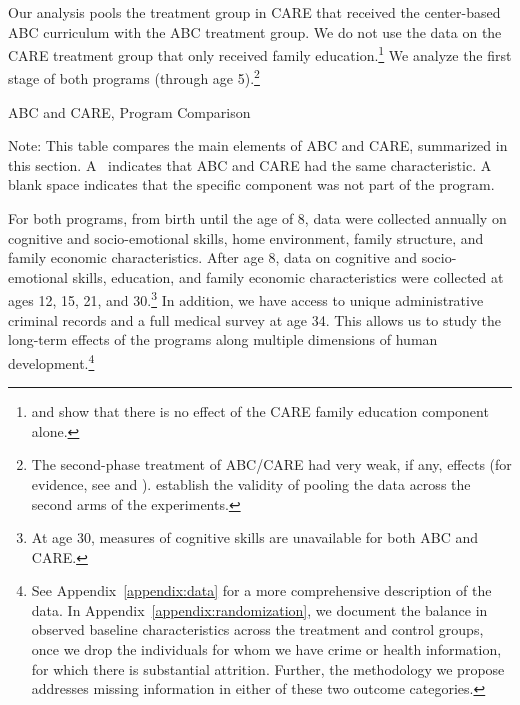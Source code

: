 Our analysis pools the treatment group in CARE that received the center-based ABC curriculum with the ABC treatment group. We do not use the data on the CARE treatment group that only received family education.\footnote{\citet{Campbell_Conti_etal_2014_EarlyChildhoodInvestments} and \citet{ABCCARE_Dataset} show that there is no effect of the CARE family education component alone.} We analyze the first stage of both programs (through age 5).\footnote{The second-phase treatment of ABC/CARE had very weak, if any, effects (for evidence, see \citealp{Campbell_Conti_etal_2014_EarlyChildhoodInvestments} and \citealp{ABCCARE_Dataset}). \citet{Campbell_Conti_etal_2014_EarlyChildhoodInvestments} establish the validity of pooling the data across the second arms of the experiments.}

\begin{table}[!htbp]
\centering
\caption{ABC and CARE, Program Comparison} \label{tab:programcomparison}
\begin{adjustbox}{max width=\textwidth}
\begin{threeparttable}
	\small
	
\begin{tablenotes}
\small
\item Note: This table compares the main elements of ABC and CARE, summarized in this section. A \checkmark\ indicates that ABC and CARE had the same characteristic. A blank space indicates that the specific component was not part of the program.
\end{tablenotes}
\end{threeparttable}
\end{adjustbox}
\end{table}

For both programs, from birth until the age of 8, data were collected annually on cognitive and socio-emotional skills, home environment, family structure, and family economic characteristics. After age 8, data on cognitive and socio-emotional skills, education, and family economic characteristics were collected at ages 12, 15, 21, and 30.\footnote{At age 30, measures of cognitive skills are unavailable for both ABC and CARE.} In addition, we have access to unique administrative criminal records and a full medical survey at age 34. This allows us to study the long-term effects of the programs along multiple dimensions of human development.\footnote{See Appendix~\ref{appendix:data} for a more comprehensive description of the data. In Appendix~\ref{appendix:randomization}, we document the balance in observed baseline characteristics across the treatment and control groups, once we drop the individuals for whom we have crime or health information, for which there is substantial attrition. Further, the methodology we propose addresses missing information in either of these two outcome categories.}

